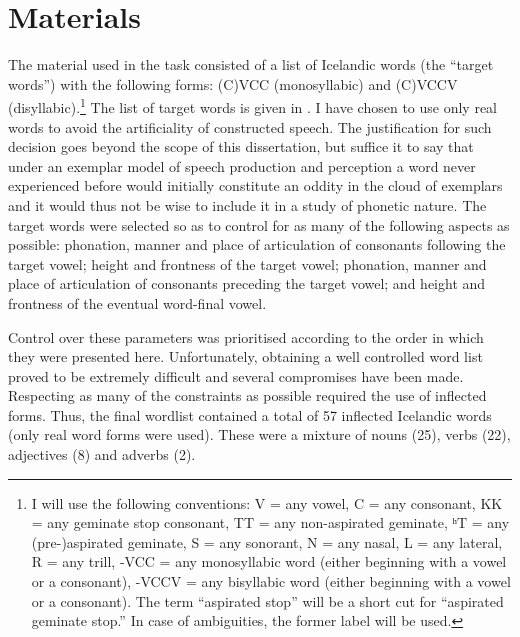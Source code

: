 \documentclass[11pt,a4paper,oneside,openany]{memoir}\usepackage[]{graphicx}\usepackage[]{color}
\begin{document}

\section{Materials}
\label{s:materials}

The material used in the task consisted of a list of Icelandic words (the ``target words'') with the following forms: (C)VCC (monosyllabic) and (C)VCCV (disyllabic).\footnote{I will use the following conventions: V = any vowel, C = any consonant, KK = any geminate stop consonant, TT = any non-aspirated geminate, ʰT = any (pre-)aspirated geminate, S = any sonorant, N = any nasal, L = any lateral, R = any trill, -VCC = any monosyllabic word (either beginning with a vowel or a consonant), -VCCV = any bisyllabic word (either beginning with a vowel or a consonant).
The term ``aspirated stop'' will be a short cut for ``aspirated geminate stop.''
In case of ambiguities, the former label will be used.
}
The list of target words is given in .
I have chosen to use only real words to avoid the artificiality of constructed speech.
The justification for such decision goes beyond the scope of this dissertation, but suffice it to say that under an exemplar model of speech production and perception \citep{johnson1997,pierrehumbert2001,bybee2002,johnson2007} a word never experienced before would initially constitute an oddity in the cloud of exemplars and it would thus not be wise to include it in a study of phonetic nature.
The target words were selected so as to control for as many of the following aspects as possible: phonation, manner and place of articulation of consonants following the target vowel; height and frontness of the target vowel; phonation, manner and place of articulation of consonants preceding the target vowel; and height and frontness of the eventual word-final vowel.

Control over these parameters was prioritised according to the order in which they were presented here.
Unfortunately, obtaining a well controlled word list proved to be extremely difficult and several compromises have been made.
Respecting as many of the constraints as possible required the use of inflected forms.
Thus, the final wordlist contained a total of 57 inflected Icelandic words (only real word forms were used).
These were a mixture of nouns (25), verbs (22), adjectives (8) and adverbs (2).
\end{document}
